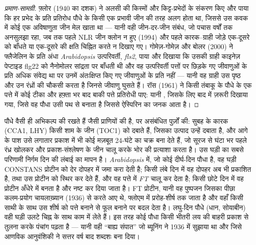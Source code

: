 \begin{proof}[प्रमाण-सामग्री]
फ़्लोर (1940 का दशक) ने अलसी की किस्मों और किट्ट-प्रभेदों के संकरण किए
और पाया कि हर प्रभेद के प्रति प्रतिरोध पौधे के किसी एक प्रभावी जीन की
तरह अलग होता था, जिससे उस कवक में कोई एक अविषाणुता जीन मेल खाता था ---
यानी वही जीन-दर-जीन संबंध, जो पचास वर्षों तक अनसुलझा रहा, जब तक पहले
NLR जीन क्लोन न हुए (1994) और पहले कारक--ग्राही जोड़े एक-दूसरे को
बाँधते या एक-दूसरे की क्षति चिह्नित करते न दिखाए गए। गोमेज़-गोमेज़ और
बोलर (2000) ने फ्लैजेलिन के प्रति अंधा \emph{Arabidopsis} उत्परिवर्ती,
\emph{fls2}, पाया और दिखाया कि उसकी ग्राही काइनेज़ पेप्टाइड flg22 को
नैनोमोलर सांद्रता पर बाँधती थी और वह उत्परिवर्ती पत्तों पर छिड़के गए
जीवाणुओं के प्रति अधिक संवेद्य था पर उनमें अंतःक्षिप्त किए गए जीवाणुओं
के प्रति नहीं --- यानी वह ग्राही उस पृष्ठ और उन रंध्रों की चौकसी करता
है जिनसे जीवाणु घुसते हैं। रॉस (1961) ने किसी तंबाकू के पौधे के एक
पत्ते में कोई  टीका और हफ़्ता भर बाद बाकी पत्ते प्रतिरोधी पाए:
यानी , जिसके लिए बाद में 
ज़रूरी दिखाया गया, जिसे वह पौधा उसी पथ से बनाता है जिससे ऐस्पिरिन का
जनक आता है।
\end{proof}

\begin{example}[पौधे की घड़ी और दिन की लंबाई]\label{ex:b3:plant-molecular-physiology:clock}
पौधे वैसी ही अभिकल्प की  रखते हैं जैसी प्राणियों की है, पर
असंबंधित पुर्ज़ों की: सुबह के कारक (CCA1, LHY) किसी शाम के जीन (TOC1)
को दबाते हैं, जिसका उत्पाद उन्हें दबाता है, और आगे के पाश उसे लगातार
प्रकाश में भी कोई मज़बूत 24-घंटे का चक्र बना देते हैं, जो सूरज से घंटा
भर पहले रंध्र खोलकर और प्रकाश-संश्लेषण के जीन चालू करके भोर की
प्रत्याशा करता है। उस घड़ी का सबसे परिणामी निर्गम दिन की लंबाई का मापन
है। \emph{Arabidopsis} में, जो कोई दीर्घ-दिन पौधा है, वह घड़ी CONSTANS
प्रोटीन को देर दोपहर में जमा करा देती है; किसी लंबे दिन में वह दोपहर अब
भी प्रकाशित है,  तथा  उस प्रोटीन को स्थिर कर
देते हैं, और वह पत्ते में \emph{FT} चालू कर देता है; किसी छोटे दिन में
वह प्रोटीन अँधेरे में बनता है और नष्ट कर दिया जाता है। FT प्रोटीन, यानी
वह पुष्पजन जिसका पीछा कलम-प्रयोग चायलाख़्यान (1936) से करते आए थे,
फ्लोएम में प्ररोह-शीर्ष तक जाता है और वहाँ किसी साथी के साथ उस शीर्ष को
पत्ते बनाने से फूल बनाने पर बदल देता है। लघु-दिन पौधे (धान, सोयाबीन) वही
घड़ी उलटे चिह्न के साथ काम में लेते हैं। इस तरह कोई पौधा किसी भीतरी लय
की बाहरी प्रकाश से तुलना करके पंचांग पढ़ता है --- यानी वही ``बाह्य
संपात'' जो ब्यूनिंग ने 1936 में सुझाया था और जिसे आणविक आनुवंशिकी ने
सत्तर वर्ष बाद शब्दशः बना दिया।
\end{example}

